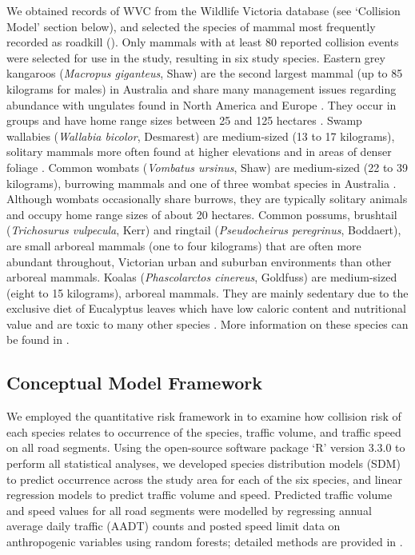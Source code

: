 We obtained records of WVC from the Wildlife Victoria database (see `Collision Model' section below), and selected the species of mammal most frequently recorded as roadkill (). Only mammals with at least 80 reported collision events were selected for use in the study, resulting in six study species.  Eastern grey kangaroos (\textit{Macropus giganteus}, Shaw) are the second largest mammal (up to 85 kilograms for males) in Australia and share many management issues regarding abundance with ungulates found in North America and Europe \citep{crof04,coul10}. They occur in groups and have home range sizes between 25 and 125 hectares \citep{daws12}.  Swamp wallabies (\textit{Wallabia bicolor}, Desmarest) are medium-sized (13 to 17 kilograms), solitary mammals more often found at higher elevations and in areas of denser foliage \citep{vand08}. Common wombats (\textit{Vombatus ursinus}, Shaw) are medium-sized (22 to 39 kilograms), burrowing mammals and one of three wombat species in Australia \citep{vand08}. Although wombats occasionally share burrows, they are typically solitary animals and occupy home range sizes of about 20 hectares. Common possums, brushtail (\textit{Trichosurus vulpecula}, Kerr) and ringtail (\textit{Pseudocheirus peregrinus}, Boddaert), are small arboreal mammals (one to four kilograms) that are often more abundant throughout, Victorian urban and suburban environments than other arboreal mammals.  Koalas (\textit{Phascolarctos cinereus}, Goldfuss) are medium-sized (eight to 15 kilograms), arboreal mammals.  They are mainly sedentary due to the exclusive diet of Eucalyptus leaves which have low caloric content and nutritional value and are toxic to many other species \citep{vand08}. More information on these species can be found in .

\subsection{Conceptual Model Framework}

We employed the quantitative risk framework in  to examine how collision risk of each species relates to occurrence of the species, traffic volume, and traffic speed on all road segments. Using the open-source software package `R' version 3.3.0 \citep{rdct16} to perform all statistical analyses, we developed species distribution models (SDM) to predict occurrence across the study area for each of the six species, and linear regression models to predict traffic volume and speed. Predicted traffic volume and speed values for all road segments were modelled by regressing annual average daily traffic (AADT) counts and posted speed limit data on anthropogenic variables using random forests; detailed methods are provided in . 

